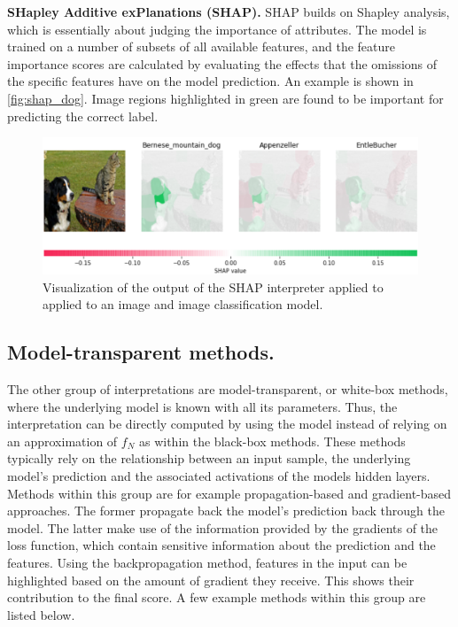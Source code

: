 \documentclass[sigconf]{acmart}
\newcommand{\mypar}[1]{\vspace{0.2cm}\noindent\textbf{#1}}
\begin{document}
\mypar{SHapley Additive exPlanations (SHAP).} SHAP \cite{lundberg2017unified} builds on Shapley analysis, which is essentially about judging the importance of attributes. The model is trained on a number of subsets of all available features, and the feature importance scores are calculated by evaluating the effects that the omissions of the specific features have on the model prediction. An example is shown in \autoref{fig:shap_dog}. Image regions highlighted in green are found to be important for predicting the correct label.

\begin{figure}[ht]
  \centering
  \includegraphics[width=\linewidth]{figures/cat_dog_shap.png}
  \caption{Visualization of the output of the SHAP interpreter applied to applied to an image and image classification model.}\label{fig:shap_dog}
  \vspace{-0.3cm}
\end{figure}


\subsection{Model-transparent methods.}
\label{subsec:wb_methods}

The other group of interpretations are model-transparent, or white-box methods, where the underlying model is known with all its parameters. Thus, the interpretation can be directly computed by using the model instead of relying on an approximation of $f_N$ as within the black-box methods. These methods typically rely on the relationship between an input sample, the underlying model's prediction and the associated activations of the models hidden layers. Methods within this group are for example propagation-based and gradient-based approaches. The former propagate back the model's prediction back through the model. The latter make use of the information provided by the gradients of the loss function, which contain sensitive information about the prediction and the features. Using the backpropagation method, features in the input can be highlighted based on the amount of gradient they receive. This shows their contribution to the final score. 
A few example methods within this group are listed below. 
\end{document}
